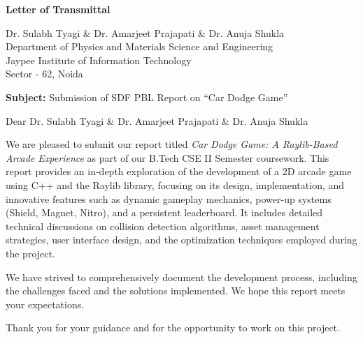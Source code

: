 \documentclass[12pt,a4paper]{article}
\begin{document}
\begin{center}
    \Large\textbf{Letter of Transmittal}
\end{center}
\vspace{1cm}

\noindent
Dr. Sulabh Tyagi \& Dr. Amarjeet Prajapati \& Dr. Anuja Shukla \\
Department of Physics and Materials Science and Engineering \\
Jaypee Institute of Information Technology \\
Sector - 62, Noida \\

\vspace{1cm}

\noindent
\textbf{Subject:} Submission of SDF PBL Report on ``Car Dodge Game'' \\

\vspace{1cm}

\noindent
Dear Dr. Sulabh Tyagi \& Dr. Amarjeet Prajapati \& Dr. Anuja Shukla \\

\vspace{1em}

\noindent
We are pleased to submit our report titled \textit{Car Dodge Game: A Raylib-Based Arcade Experience} as part of our B.Tech CSE II Semester coursework. This report provides an in-depth exploration of the development of a 2D arcade game using C++ and the Raylib library, focusing on its design, implementation, and innovative features such as dynamic gameplay mechanics, power-up systems (Shield, Magnet, Nitro), and a persistent leaderboard. It includes detailed technical discussions on collision detection algorithms, asset management strategies, user interface design, and the optimization techniques employed during the project. \\

\vspace{1em}

\noindent
We have strived to comprehensively document the development process, including the challenges faced and the solutions implemented. We hope this report meets your expectations. \\

\vspace{1em}

\noindent
Thank you for your guidance and for the opportunity to work on this project. \\
\end{document}

